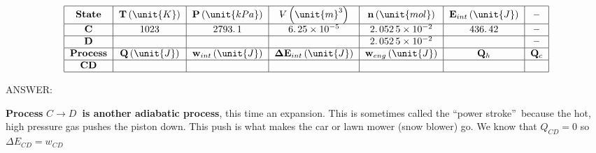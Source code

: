 \documentclass{article}
\begin{document}
\[
\begin{tabular}{|c|c|c|c|c|c|c|}
\hline
\textbf{State} & $\mathbf{T}\left( \unit{K}\right) $ & $\mathbf{P}\left( 
\unit{kPa}\right) $ & $%
\ooalign{\hfil$V$\hfil\cr\kern0.1em--\hfil\cr}%
\left( \unit{m}^{3}\right) $ & $\mathbf{n}\left( \unit{mol}\right) $ & $%
\mathbf{E}_{int}\left( \unit{J}\right) $ & \textbf{--} \\ \hline
$\mathbf{C}$ & $1023$ & $2793.\,\allowbreak 1$ & $6.\,25\times 10^{-5}$ & $%
2.\,052\,5\times 10^{-2}$ & $436.\,\allowbreak 42$ & \textbf{--} \\ \hline
$\mathbf{D}$ &  &  &  & $2.\,052\,5\times 10^{-2}$ &  & \textbf{--} \\ \hline
\textbf{Process} & $\mathbf{Q}\left( \unit{J}\right) $ & $\mathbf{w}%
_{int}\left( \unit{J}\right) $ & $\mathbf{\Delta E}_{int}\left( \unit{J}%
\right) $ & $\mathbf{w}_{eng}\left( \unit{J}\right) $ & $\mathbf{Q}_{h}$ & $%
\mathbf{Q}_{c}$ \\ \hline
$\mathbf{CD}$ &  &  &  &  &  &  \\ \hline
\end{tabular}%
\]

ANSWER:


\textbf{Process }$C\rightarrow D$\textbf{\ is another adiabatic process},
this time an expansion. This is sometimes called the \textquotedblleft power
stroke\textquotedblright\ because the hot, high pressure gas pushes the
piston down. This push is what makes the car or lawn mower (snow blower) go.
We know that $Q_{CD}=0$ so $\Delta E_{CD}=w_{CD}$
\end{document}
